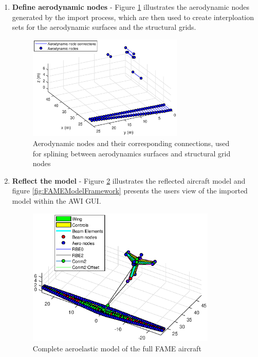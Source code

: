 \begin{enumerate}
\item \textbf{Define aerodynamic nodes} - Figure \ref{fig:FAMEAerodynamicNodes} illustrates the aerodynamic nodes generated by the import process, which are then used to create interploation sets for the aerodynamic surfaces and the structural grids. 

\begin{figure}[h!]
\centering
\includegraphics[width = 0.7\textwidth]{FAMEAerodynamicNodes}
\caption{Aerodynamic nodes and their corresponding connections, used for splining between aerodynamics surfaces and structural grid nodes}\label{fig:FAMEAerodynamicNodes}
\end{figure}

\item \textbf{Reflect the model} - Figure \ref{fig:ReflectedModel} illustrates the reflected aircraft model and figure \ref{fig:FAMEModelFramework} presents the users view of the imported model within the AWI GUI.

\begin{figure}[h!]
\centering
\includegraphics[width = 0.85\textwidth]{ReflectedModel}
\caption{Complete aeroelastic model of the full FAME aircraft}\label{fig:ReflectedModel}
\end{figure}


\end{enumerate}
